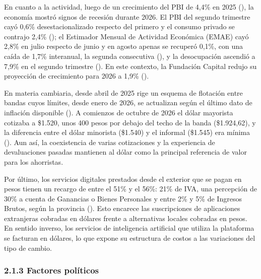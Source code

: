 En cuanto a la actividad, luego de un crecimiento del PBI de 4,4\% en
2025 (), la economía mostró
signos de recesión durante 2026. El PBI del segundo trimestre cayó 0,6\%
desestacionalizado respecto del primero y el consumo privado se contrajo
2,4\% (); el Estimador Mensual de Actividad Económica (EMAE) cayó
2,8\% en julio respecto de junio y en agosto apenas se recuperó 0,1\%,
con una caída de 1,7\% interanual, la segunda consecutiva
(), y la desocupación ascendió a 7,9\% en el segundo
trimestre (). En este contexto, la Fundación Capital redujo su
proyección de crecimiento para 2026 a 1,9\%
().

En materia cambiaria, desde abril de 2025 rige un esquema de flotación
entre bandas cuyos límites, desde enero de 2026, se actualizan según el
último dato de inflación disponible
(). A comienzos de
octubre de 2026 el dólar mayorista cotizaba a \$1.520, unos 400 pesos
por debajo del techo de la banda (\$1.924,62), y la diferencia entre el
dólar minorista (\$1.540) y el informal (\$1.545) era mínima
(). Aun así, la
coexistencia de varias cotizaciones y la experiencia de devaluaciones
pasadas mantienen al dólar como la principal referencia de valor para
los ahorristas.

Por último, los servicios digitales prestados desde el exterior que se
pagan en pesos tienen un recargo de entre el 51\% y el 56\%: 21\% de
IVA, una percepción de 30\% a cuenta de Ganancias o Bienes Personales y
entre 2\% y 5\% de Ingresos Brutos, según la provincia
(). Esto encarece las
suscripciones de aplicaciones extranjeras cobradas en dólares frente a
alternativas locales cobradas en pesos. En sentido inverso, los
servicios de inteligencia artificial que utiliza la plataforma se
facturan en dólares, lo que expone su estructura de costos a las
variaciones del tipo de cambio.

\subsubsection*{2.1.3 Factores políticos}\label{factores-poluxedticos}


